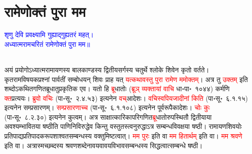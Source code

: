 \section[रामेणोक्तं पुरा मम]{रामेणोक्तं पुरा मम}
\centering\textcolor{blue}{शृणु देवि प्रवक्ष्यामि गुह्याद्गुह्यतरं महत्।\nopagebreak\\
अध्यात्मरामचरितं रामेणोक्तं पुरा मम॥}\nopagebreak\\
\\
\begin{sloppypar}\justifying\noindent\hspace{10mm} अयं प्रयोगोऽध्यात्म\-रामायणस्य बाल\-काण्डस्य द्वितीय\-सर्गस्य चतुर्थे श्लोके शिवेन कृतो वर्तते। कृत\-राम\-विषयक\-प्रश्नां पार्वतीं सम्बोधयन् शिवः प्राह यत् \textcolor{red}{यत्कथा\-वस्तु पुरा रामेण ममोक्तम्‌}। अत्र तु \textcolor{red}{उक्तम्‌} इति शब्दोऽकथित\-गणित\-ब्रू\-धातु\-प्रकृतिक एव। यतो हि \textcolor{red}{ब्रू}\-धातोः (\textcolor{red}{ब्रूञ् व्यक्तायां वाचि} धा॰पा॰~१०४४) कर्मणि \textcolor{red}{क्त}\-प्रत्ययः। \textcolor{red}{ब्रुवो वचिः} (पा॰सू॰~२.४.५३) इत्यनेन \textcolor{red}{वच्‌}\-आदेशः। \textcolor{red}{वचि\-स्वपि\-यजादीनां किति} (पा॰सू॰~६.१.१५) इत्यनेन सम्प्रसारणम्। \textcolor{red}{सम्प्रसारणाच्च} (पा॰सू॰~६.१.१०८) इत्यनेन पूर्वरूपैकादेशः। \textcolor{red}{चोः कुः} (पा॰सू॰~८.२.३०) इत्यनेन कुत्वम्। अत्र साक्षात्कारिका\-परिगणित\-\textcolor{red}{ब्रू}\-धातोरुपस्थितौ द्वितीयाया अवश्यम्भावितया षष्ठीति पाणिनि\-विरुद्धेव किन्तु वस्तुतस्त्वनुरुद्धाऽत्र सम्बन्ध\-विवक्षया षष्ठी। रामायण\-शिवयोः प्रतिपाद्य\-प्रतिपादक\-रूप\-शाश्वत\-सम्बन्धस्य वक्तुमिष्टत्वात्।
\textcolor{red}{मम पुरः} इति वा \textcolor{red}{मम हितार्थम्‌} इति वा। \textcolor{red}{मम श्रवणे} इति वा। अत्रास्मच्छब्दस्य श्रवण\-शब्देनावयवावयवि\-भाव\-सम्बन्धस्य सिद्धत्वात्सम्बन्धे षष्ठी।\end{sloppypar}
